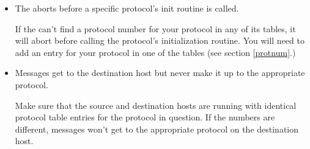 \begin{itemize}
\item{}
The \xk{} aborts before a specific protocol's init routine is called.

If the \xk{} can't find a protocol number for your protocol in any of
its tables, it will abort before calling the protocol's initialization
routine.  You will need to add an entry for your protocol in one of
the tables (see section \ref{protnum}.)

\item{}
Messages get to the destination host but never make it up to the
appropriate protocol.

Make sure that the source and destination hosts are running with
identical protocol table entries for the protocol in question.  If the
numbers are different, messages won't get to the appropriate protocol
on the destination host.

\end{itemize}